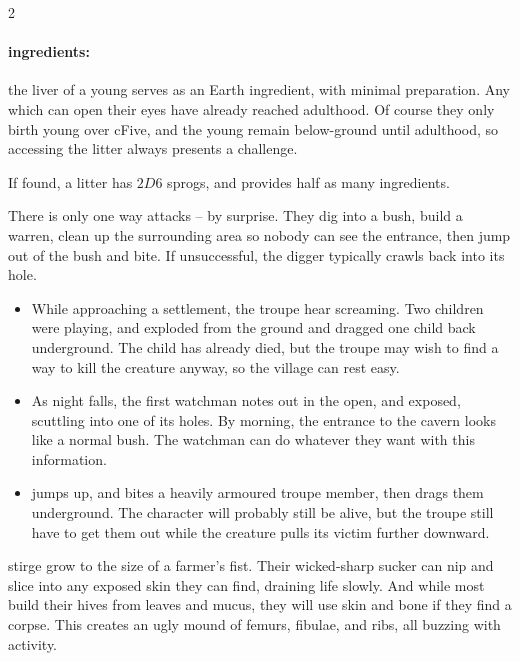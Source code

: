 \begin{multicols}{2}
\paragraph{\Glspl{ingredient}:}
the liver of a young  serves as an Earth \gls{ingredient}, with minimal preparation.
Any which can open their eyes have already reached adulthood.
Of course they only birth young over \gls{cFive}, and the young remain below-ground until adulthood, so accessing the litter always presents a challenge.

If found, a litter has $2D6$ sprogs, and provides half as many \glspl{ingredient}.

\showEnc
There is only one way  attacks -- by surprise.  They dig into a bush, build a warren, clean up the surrounding area so nobody can see the entrance, then jump out of the bush and bite.  If unsuccessful, the \gls{digger} typically crawls back into its hole.

\begin{itemize}
  \item
  While approaching a settlement, the troupe hear screaming.
  Two children were playing, and  exploded from the ground and dragged one child back underground.
  The child has already died, but the troupe may wish to find a way to kill the creature anyway, so the \gls{village} can rest easy.
  \item
  As night falls, the first watchman notes  out in the open, and exposed, scuttling into one of its holes.
  By morning, the entrance to the cavern looks like a normal bush.
  The watchman can do whatever they want with this information.
  \item
   jumps up, and bites a heavily armoured troupe member, then drags them underground.
  The character will probably still be alive, but the troupe still have to get them out while the creature pulls its victim further downward.

\end{itemize}

\mouthdigger

  {stirge}%
grow to the size of a farmer's fist.
Their wicked-sharp sucker can nip and slice into any exposed skin they can find, draining life slowly.
And while most build their hives from leaves and mucus, they will use skin and bone if they find a corpse.
This creates an ugly mound of femurs, fibulae, and ribs, all buzzing with activity.


\end{multicols}
